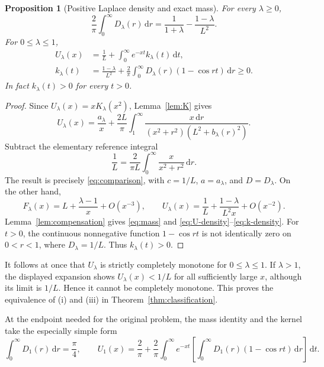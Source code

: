 \documentclass[11pt,a4paper]{article}
\newtheorem{proposition}[theorem]{Proposition}
\theoremstyle{definition}\newtheorem{definition}[theorem]{Definition}
\theoremstyle{remark}\newtheorem{remark}[theorem]{Remark}
\newcommand{\dd}{\,\mathrm d}
\begin{document}
\begin{proposition}[Positive Laplace density and exact mass]
\label{prop:kernel}
For every $\lambda\ge0$,
\begin{equation}\label{eq:mass}
 \frac2\pi\int_0^\infty D_\lambda(r)\dd r
 =\frac1{1+\lambda}-\frac{1-\lambda}{L^2}.
\end{equation}
For $0\le\lambda\le1$,
\begin{align}
 U_\lambda(x)&=\frac1L+
           \int_0^\infty e^{-xt}k_\lambda(t)\dd t,
          \label{eq:U-density}\\
 k_\lambda(t)&=\frac{1-\lambda}{L^2}
       +\frac2\pi\int_0^\infty
                     D_\lambda(r)(1-\cos rt)\dd r\ge0.
          \label{eq:k-density}
\end{align}
In fact $k_\lambda(t)>0$ for every $t>0$.
\end{proposition}

\begin{proof}
Since $U_\lambda(x)=xK_\lambda(x^2)$, Lemma~\ref{lem:K} gives
\[
 U_\lambda(x)=\frac{a_\lambda}{x}
 +\frac{2L}{\pi}\int_1^\infty
 \frac{x\dd r}{(x^2+r^2)(L^2+b_\lambda(r)^2)}.
\]
Subtract the elementary reference integral
\[
 \frac1L=\frac2{\pi L}\int_0^\infty
                         \frac{x}{x^2+r^2}\dd r.
\]
The result is precisely \eqref{eq:comparison}, with $c=1/L$,
$a=a_\lambda$, and $D=D_\lambda$. On the other hand,
\[
 F_\lambda(x)=L+\frac{\lambda-1}{x}+O(x^{-3}),\qquad
 U_\lambda(x)=\frac1L+\frac{1-\lambda}{L^2x}+O(x^{-2}).
\]
Lemma~\ref{lem:compensation} gives \eqref{eq:mass} and
\eqref{eq:U-density}--\eqref{eq:k-density}.
For $t>0$, the continuous nonnegative function $1-\cos rt$ is
not identically zero on $0<r<1$, where $D_\lambda=1/L$.
Thus $k_\lambda(t)>0$.
\end{proof}

It follows at once that $U_\lambda$ is strictly completely monotone
for $0\le\lambda\le1$. If $\lambda>1$, the displayed expansion
shows $U_\lambda(x)<1/L$ for all sufficiently large $x$, although
its limit is $1/L$. Hence it cannot be completely monotone. This
proves the equivalence of (i) and (iii) in
Theorem~\ref{thm:classification}.

At the endpoint needed for the original problem, the mass identity
and the kernel take the especially simple form
\begin{equation}\label{eq:endpoint}
 \int_0^\infty D_1(r)\dd r=\frac\pi4,\qquad
 U_1(x)=\frac2\pi+\frac2\pi\int_0^\infty e^{-xt}
       \left[\int_0^\infty D_1(r)(1-\cos rt)\dd r\right]\dd t.
\end{equation}
\end{document}
